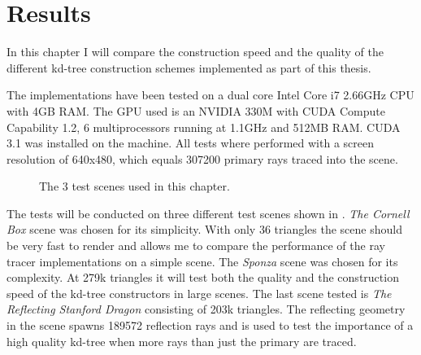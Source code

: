 
\chapter{Results}\label{chp:results}



In this chapter I will compare the construction speed and the quality of the
different kd-tree construction schemes implemented as part of this thesis.


The implementations have been tested on a dual core Intel Core i7 2.66GHz CPU
with 4GB RAM. The GPU used is an NVIDIA 330M with CUDA Compute Capability 1.2, 6
multiprocessors running at 1.1GHz and 512MB RAM. CUDA 3.1 was installed on the
machine. All tests where performed with a screen resolution of 640x480, which
equals 307200 primary rays traced into the scene.

\begin{figure}
  \centering
  \caption[Test scenes.]{The 3 test scenes used in this chapter.}
  \label{fig:testScenes}
\end{figure}


The tests will be conducted on three different test scenes shown in
. \textit{The Cornell Box} scene was chosen for its
simplicity. With only 36 triangles the scene should be very fast to render and
allows me to compare the performance of the ray tracer implementations on a
simple scene. The \textit{Sponza} scene was chosen for its complexity. At 279k
triangles it will test both the quality and the construction speed of the
kd-tree constructors in large scenes. The last scene tested is \textit{The
  Reflecting Stanford Dragon} consisting of 203k triangles. The reflecting
geometry in the scene spawns 189572 reflection rays and is used to test
the importance of a high quality kd-tree when more rays than just the primary
are traced.

